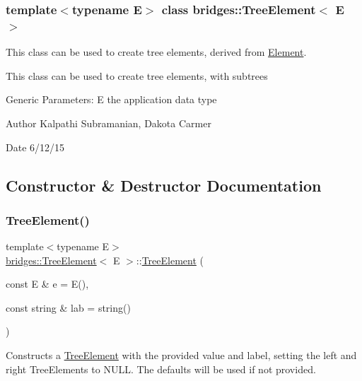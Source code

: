 \subsubsection*{template$<$typename E$>$\newline
class bridges\+::\+Tree\+Element$<$ E $>$}

This class can be used to create tree elements, derived from \hyperlink{classbridges_1_1_element}{Element}. 

This class can be used to create tree elements, with subtrees

Generic Parameters\+: E the application data type

\begin{DoxyAuthor}{Author}
Kalpathi Subramanian, Dakota Carmer 
\end{DoxyAuthor}
\begin{DoxyDate}{Date}
6/12/15 
\end{DoxyDate}


\subsection{Constructor \& Destructor Documentation}
\hypertarget{classbridges_1_1_tree_element_a4e96ffab9a6c711ead687dd8a42e80a0}{}\label{classbridges_1_1_tree_element_a4e96ffab9a6c711ead687dd8a42e80a0} 
\subsubsection{\texorpdfstring{Tree\+Element()}{TreeElement()}}
{\footnotesize\ttfamily template$<$typename E$>$ \\
\hyperlink{classbridges_1_1_tree_element}{bridges\+::\+Tree\+Element}$<$ E $>$\+::\hyperlink{classbridges_1_1_tree_element}{Tree\+Element} (\begin{DoxyParamCaption}\item[{const E \&}]{e = {\ttfamily E()},  }\item[{const string \&}]{lab = {\ttfamily string()} }\end{DoxyParamCaption})\hspace{0.3cm}{\ttfamily [inline]}}

Constructs a \hyperlink{classbridges_1_1_tree_element}{Tree\+Element} with the provided value and label, setting the left and right Tree\+Elements to N\+U\+LL. The defaults will be used if not provided.


